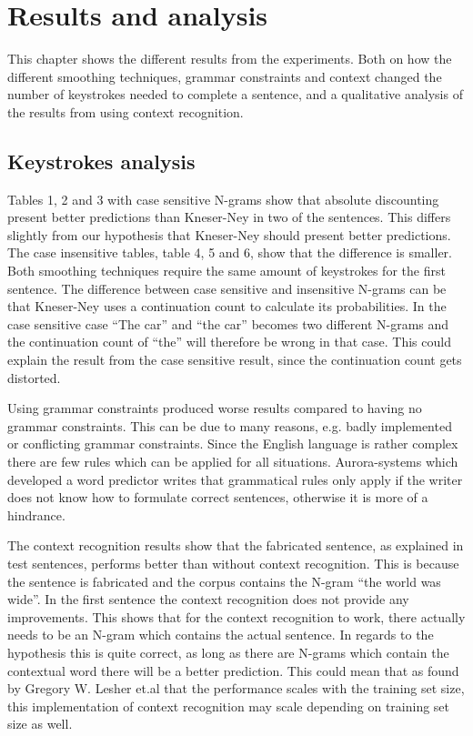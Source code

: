 \section{Results and analysis}
This chapter shows the different results from the experiments. Both on how the different smoothing techniques, grammar constraints and context changed the number of keystrokes needed to complete a sentence, and a qualitative analysis of the results from using context recognition.

\subsection{Keystrokes analysis}
Tables 1, 2 and 3 with case sensitive N-grams show that absolute discounting present better predictions than Kneser-Ney in two of the sentences. This differs slightly from our hypothesis that Kneser-Ney should present better predictions. The case insensitive tables, table 4, 5 and 6, show that the difference is smaller. Both smoothing techniques require the same amount of keystrokes for the first sentence. The difference between case sensitive and insensitive N-grams can be that Kneser-Ney uses a continuation count to calculate its probabilities. In the case sensitive case “The car” and “the car” becomes two different N-grams and the continuation count of “the” will therefore be wrong in that case. This could explain the result from the case sensitive result, since the continuation count gets distorted.

Using grammar constraints produced worse results compared to having no grammar constraints. This can be due to many reasons, e.g. badly implemented or conflicting grammar constraints. Since the English language is rather complex there are few rules which can be applied for all situations. Aurora-systems which developed a word predictor writes that grammatical rules only apply if the writer does not know how to formulate correct sentences, otherwise it is more of a hindrance\cite{aurora}.

The context recognition results show that the fabricated sentence, as explained in test sentences, performs better than without context recognition. This is because the sentence is fabricated and the corpus contains the N-gram “the world was wide”. In the first sentence the context recognition does not provide any improvements. This shows that for the context recognition to work, there actually needs to be an N-gram which contains the actual sentence. In regards to the hypothesis this is quite correct, as long as there are N-grams which contain the contextual word there will be a better prediction. This could mean that as found by Gregory W. Lesher et.al that the performance scales with the training set size\cite{Lesher99effectsof}, this implementation of context recognition may scale depending on training set size as well.
\vspace{1em}
